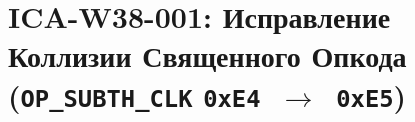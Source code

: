 %

\chapter{ICA-W38-001: Исправление Коллизии Священного Опкода
  (\texttt{OP\_SUBTH\_CLK} \texttt{0xE4}~$\to$~\texttt{0xE5})}%
\label{ch:ica-w38-001-rectify}


